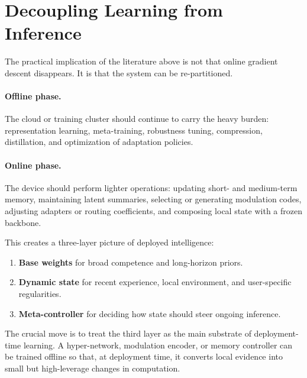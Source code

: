 \documentclass[11pt,a4paper]{article}
\begin{document}
\section{Decoupling Learning from Inference}

The practical implication of the literature above is not that online gradient descent disappears. It is that the system can be re-partitioned.

\paragraph{Offline phase.}
The cloud or training cluster should continue to carry the heavy burden: representation learning, meta-training, robustness tuning, compression, distillation, and optimization of adaptation policies.

\paragraph{Online phase.}
The device should perform lighter operations: updating short- and medium-term memory, maintaining latent summaries, selecting or generating modulation codes, adjusting adapters or routing coefficients, and composing local state with a frozen backbone.

This creates a three-layer picture of deployed intelligence:
\begin{enumerate}[noitemsep]
    \item \textbf{Base weights} for broad competence and long-horizon priors.
    \item \textbf{Dynamic state} for recent experience, local environment, and user-specific regularities.
    \item \textbf{Meta-controller} for deciding how state should steer ongoing inference.
\end{enumerate}

The crucial move is to treat the third layer as the main substrate of deployment-time learning. A hyper-network, modulation encoder, or memory controller can be trained offline so that, at deployment time, it converts local evidence into small but high-leverage changes in computation.
\end{document}
